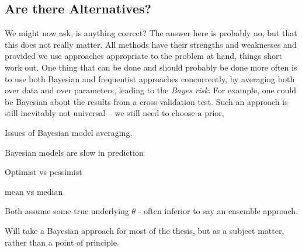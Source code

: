 \subsection{Are there Alternatives?}
\label{sec:bayes:religion:correct}

We might now ask, is anything correct?  The answer here is probably no, but that this does not really matter.  All methods
have their strengths and weaknesses and provided we use approaches appropriate to the problem at hand, things short work out.
One thing that can be done and should probably be done more often is to use both Bayesian and frequentist approaches concurrently,
by averaging both over data and over parameters, leading to the \emph{Bayes risk}.   For example, one could be Bayesian 
about the results from a cross validation test.  Such an approach is still inevitably not universal -- we still need to choose
a prior, 




Issues of Bayesian model averaging.

Bayesian models are slow in prediction

Optimist vs pessimist

mean vs median

Both assume some true underlying $\theta$ - often inferior to say an ensemble approach.

Will take a Bayesian approach for most of the thesis, but as a subject matter, rather than a point of principle.